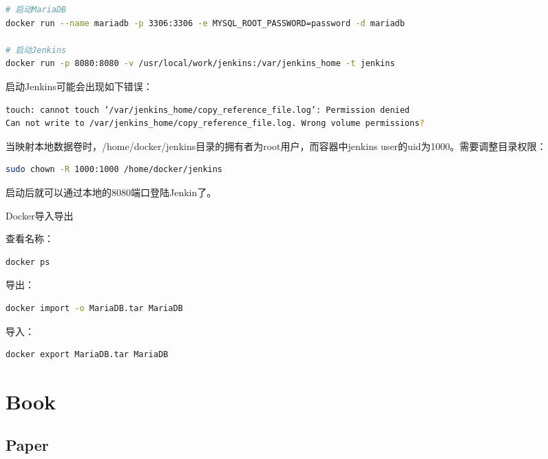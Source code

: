 \documentclass[8pt]{book}
\makeatletter
\numberwithin{dummy}{section}
\theoremstyle{ocrenumbox}
\theoremstyle{blacknumex}
\theoremstyle{blacknumbox}
\theoremstyle{ocrenum}
\renewcommand{\subsection}{\@startsection {subsection}{2}{\z@}
	{-3ex \@plus -0.1ex \@minus -.4ex}
	{0.5ex \@plus.2ex }
	{\normalfont\sffamily\bfseries}}
\makeatother
\begin{document}
\begin{lstlisting}[language=Bash]
# 启动MariaDB
docker run --name mariadb -p 3306:3306 -e MYSQL_ROOT_PASSWORD=password -d mariadb

# 启动Jenkins
docker run -p 8080:8080 -v /usr/local/work/jenkins:/var/jenkins_home -t jenkins
\end{lstlisting}

启动Jenkins可能会出现如下错误：

\begin{lstlisting}[language=Bash]
touch: cannot touch ‘/var/jenkins_home/copy_reference_file.log’: Permission denied
Can not write to /var/jenkins_home/copy_reference_file.log. Wrong volume permissions?
\end{lstlisting}

当映射本地数据卷时，/home/docker/jenkins目录的拥有者为root用户，而容器中jenkins user的uid为1000。需要调整目录权限：

\begin{lstlisting}[language=Bash]
sudo chown -R 1000:1000 /home/docker/jenkins
\end{lstlisting}

启动后就可以通过本地的8080端口登陆Jenkin了。

\subsection{Docker导入导出}

查看名称：

\begin{lstlisting}[language=Bash]
docker ps
\end{lstlisting}

导出：

\begin{lstlisting}[language=Bash]
docker import -o MariaDB.tar MariaDB
\end{lstlisting}

导入：

\begin{lstlisting}[language=Bash]
docker export MariaDB.tar MariaDB
\end{lstlisting}


\part{Book}

\chapter{Paper}
\end{document}
